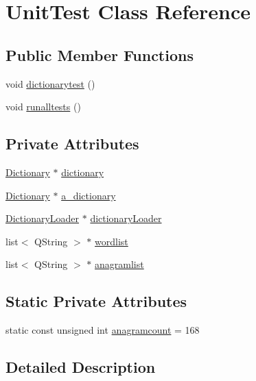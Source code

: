 \hypertarget{class_unit_test}{\section{Unit\-Test Class Reference}
\label{class_unit_test}
}
\subsection*{Public Member Functions}
\begin{DoxyCompactItemize}
\item 
void \hyperlink{class_unit_test_adab1694e1b8220401e0e8de84146c00c}{dictionarytest} ()
\item 
void \hyperlink{class_unit_test_a72c0f15a7dcecdec8eb882f861e784e2}{runalltests} ()
\end{DoxyCompactItemize}
\subsection*{Private Attributes}
\begin{DoxyCompactItemize}
\item 
\hyperlink{class_dictionary}{Dictionary} $\ast$ \hyperlink{class_unit_test_a09902f0cb75bf2c03c56912ecd4682aa}{dictionary}
\item 
\hyperlink{class_dictionary}{Dictionary} $\ast$ \hyperlink{class_unit_test_a81579d68baa8575bdf1625a0642eadf8}{a\-\_\-dictionary}
\item 
\hyperlink{class_dictionary_loader}{Dictionary\-Loader} $\ast$ \hyperlink{class_unit_test_a9cf46138e9006b18b978f6a3126c8c50}{dictionary\-Loader}
\item 
list$<$ Q\-String $>$ $\ast$ \hyperlink{class_unit_test_aeb6acd51a206123112b000f6520ac25b}{wordlist}
\item 
list$<$ Q\-String $>$ $\ast$ \hyperlink{class_unit_test_aeb6e626c75d7caa5100aa605831a439f}{anagramlist}
\end{DoxyCompactItemize}
\subsection*{Static Private Attributes}
\begin{DoxyCompactItemize}
\item 
static const unsigned int \hyperlink{class_unit_test_a9e7b7ee73cb31ffb5b98bbb69a0aa999}{anagramcount} = 168
\end{DoxyCompactItemize}


\subsection{Detailed Description}


